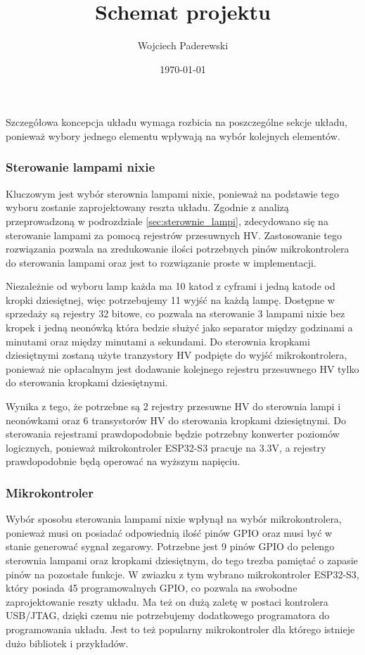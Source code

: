 \documentclass[../main.tex]{subfiles}
\author{Wojciech Paderewski}
\date{\today}
\title{Schemat projektu}
\begin{document}
Szczegółowa koncepcja układu wymaga rozbicia na poszczególne sekcje układu, ponieważ wybory jednego elementu wpływają na wybór kolejnych elementów.

\subsubsection{Sterowanie lampami nixie}
Kluczowym jest wybór sterownia lampami nixie, ponieważ na podstawie tego wyboru zostanie zaprojektowany reszta układu.
Zgodnie z analizą przeprowadzoną w podrozdziale \ref{sec:sterownie_lampi}, zdecydowano się na sterowanie lampami za pomocą rejestrów przesuwnych HV.
Zastosowanie tego rozwiązania pozwala na zredukowanie ilości potrzebnych pinów mikrokontrolera do sterowania lampami oraz jest to rozwiązanie proste w implementacji.

Niezależnie od wyboru lamp każda ma 10 katod z cyframi i jedną katode od kropki dziesiętnej, więc potrzebujemy 11 wyjść na każdą lampę.
Dostępne w sprzedaży są rejestry 32 bitowe, co pozwala na sterowanie 3 lampami nixie bez kropek i jedną neonówką która bedzie
służyć jako separator między godzinami a minutami oraz między minutami a sekundami. Do sterownia kropkami dziesiętnymi zostaną użyte tranzystory HV podpięte do wyjść mikrokontrolera,
ponieważ nie opłacalnym jest dodawanie kolejnego rejestru przesuwnego HV tylko do sterowania kropkami dziesiętnymi.

Wynika z tego, że potrzebne są 2 rejestry przesuwne HV do sterownia lampi i neonówkami oraz 6 transystorów HV do sterowania kropkami dziesiętnymi.
Do sterowania rejestrami prawdopodobnie będzie potrzebny konwerter poziomów logicznych, ponieważ mikrokontroler ESP32-S3 pracuje na 3.3V, a rejestry prawdopodobnie będą operować na wyższym napięciu.
\subsubsection{Mikrokontroler}
Wybór sposobu sterowania lampami nixie wpłynął na wybór mikrokontrolera, ponieważ musi on posiadać odpowiednią ilość pinów GPIO oraz musi być w stanie generować sygnał zegarowy.
Potrzebne jest 9 pinów GPIO do pełengo sterownia lampami oraz kropkami dziesiętnym, do tego trezba pamiętać o zapasie pinów na pozostałe funkcje. W zwiazku z tym
wybrano mikrokontroler ESP32-S3, który posiada 45 programowalnych GPIO, co pozwala na swobodne zaprojektowanie reszty układu. Ma też on dużą zaletę w postaci kontrolera USB/JTAG,
dzięki czemu nie potrzebujemy dodatkowego programatora do programowania układu. Jest to też popularny mikrokontroler dla którego istnieje dużo bibliotek i przykładów.
\end{document}
